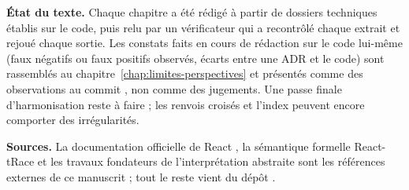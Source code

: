 \medskip

\noindent\textbf{État du texte.} Chaque chapitre a été rédigé à partir de
dossiers techniques établis sur le code, puis relu par un vérificateur qui a
recontrôlé chaque extrait et rejoué chaque sortie. Les constats faits en cours
de rédaction sur le code lui-même (faux négatifs ou faux positifs observés,
écarts entre une ADR et le code) sont rassemblés au
chapitre~\ref{chap:limites-perspectives} et présentés comme des observations
au commit \snapshotCommit{}, non comme des jugements. Une passe finale
d'harmonisation reste à faire ; les renvois croisés et l'index peuvent encore
comporter des irrégularités.

\medskip

\noindent\textbf{Sources.} La documentation officielle de React
\cite{ReactDocs}, la sémantique formelle React-tRace \cite{LeeAhnYi2025} et
les travaux fondateurs de l'interprétation abstraite
\cite{CousotCousot77,CousotCousot79,RivalYi2020} sont les références externes
de ce manuscrit ; tout le reste vient du dépôt \cite{ReactantRepo}.
